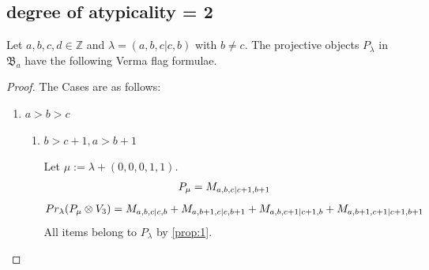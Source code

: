 
\subsection{degree of atypicality = 2}
\begin{theorem}
  Let $a,b,c,d \in \mathbb{Z}$ and $\lambda = (a,b,c|c,b)$ with $b \neq c$. The projective objects $P_{\lambda}$ in $\mathfrak{B}_{a}$ have the following Verma flag formulae.
\end{theorem}
\begin{proof} The Cases are as follows:\par
\begin{enumerate}
  \item $a>b>c$
    \begin{enumerate}
      \item $b>c+1,a>b+1$ \par
        Let $\mu:=\lambda + (0,0,0,1,1) $.
        \begin{equation}\notag
          \begin{aligned}
            P_\mu = M_{a,b,c|c+1,b+1}
          \end{aligned}
        \end{equation}
        \begin{equation}\notag
          \begin{aligned}
            Pr_{\lambda}(P_\mu \otimes V_{3}) &=
M_{a,b,c|c,b}
+ M_{a,b+1,c|c,b+1}
+ M_{a,b,c+1|c+1,b}
+ M_{a,b+1,c+1|c+1,b+1} 
          \end{aligned}
        \end{equation}
All items belong to $P_\lambda$ by \cref{prop:1}.


\end{enumerate}
\end{enumerate}
\end{proof}
